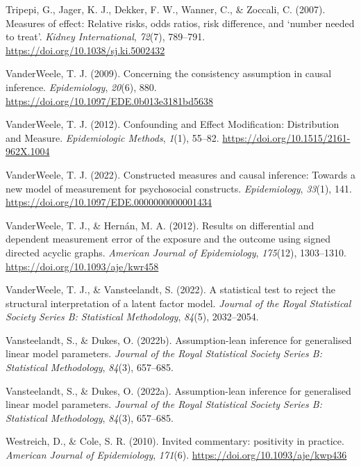\documentclass[
  single column]{article}
\newlength{\cslhangindent}
\newenvironment{CSLReferences}[2] %
 {\begin{list}{}{%
  \setlength{\itemindent}{0pt}
  \setlength{\leftmargin}{0pt}
  \setlength{\parsep}{0pt}
  \ifodd #1
   \setlength{\leftmargin}{\cslhangindent}
   \setlength{\itemindent}{-1\cslhangindent}
  \fi
  \setlength{\itemsep}{#2\baselineskip}}}
 {\end{list}}
\begin{document}
\begin{CSLReferences}{1}{0}
Tripepi, G., Jager, K. J., Dekker, F. W., Wanner, C., \& Zoccali, C.
(2007). Measures of effect: Relative risks, odds ratios, risk
difference, and {`}number needed to treat{'}. \emph{Kidney
International}, \emph{72}(7), 789--791.
\url{https://doi.org/10.1038/sj.ki.5002432}

VanderWeele, T. J. (2009). Concerning the consistency assumption in
causal inference. \emph{Epidemiology}, \emph{20}(6), 880.
\url{https://doi.org/10.1097/EDE.0b013e3181bd5638}

VanderWeele, T. J. (2012). Confounding and Effect Modification:
Distribution and Measure. \emph{Epidemiologic Methods}, \emph{1}(1),
55--82. \url{https://doi.org/10.1515/2161-962X.1004}

VanderWeele, T. J. (2022). Constructed measures and causal inference:
Towards a new model of measurement for psychosocial constructs.
\emph{Epidemiology}, \emph{33}(1), 141.
\url{https://doi.org/10.1097/EDE.0000000000001434}

VanderWeele, T. J., \& Hernán, M. A. (2012). Results on differential and
dependent measurement error of the exposure and the outcome using signed
directed acyclic graphs. \emph{American Journal of Epidemiology},
\emph{175}(12), 1303--1310. \url{https://doi.org/10.1093/aje/kwr458}

VanderWeele, T. J., \& Vansteelandt, S. (2022). A statistical test to
reject the structural interpretation of a latent factor model.
\emph{Journal of the Royal Statistical Society Series B: Statistical
Methodology}, \emph{84}(5), 2032--2054.

Vansteelandt, S., \& Dukes, O. (2022b). Assumption-lean inference for
generalised linear model parameters. \emph{Journal of the Royal
Statistical Society Series B: Statistical Methodology}, \emph{84}(3),
657--685.

Vansteelandt, S., \& Dukes, O. (2022a). Assumption-lean inference for
generalised linear model parameters. \emph{Journal of the Royal
Statistical Society Series B: Statistical Methodology}, \emph{84}(3),
657--685.

Westreich, D., \& Cole, S. R. (2010). Invited commentary: positivity in
practice. \emph{American Journal of Epidemiology}, \emph{171}(6).
\url{https://doi.org/10.1093/aje/kwp436}


\end{CSLReferences}
\end{document}
